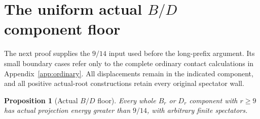 \documentclass[11pt]{article}
\newtheorem{proposition}[theorem]{Proposition}
\theoremstyle{definition}
\theoremstyle{remark}
\begin{document}
\section{The uniform actual \(B/D\) component floor}
\label{app:BDfloor}
The next proof supplies the \(9/14\) input used before the long-prefix
argument. Its small boundary cases refer only to the complete ordinary
contact calculations in Appendix~\ref{app:ordinary}. All displacements
remain in the indicated component, and all positive actual-root
constructions retain every original spectator wall.

\begin{proposition}[Actual $B/D$ floor]\label{app:prop:BDnine}
Every whole $B_r$ or $D_r$ component with $r\ge9$ has actual
projection energy greater than $9/14$, with arbitrary finite
spectators.
\end{proposition}
\end{document}
